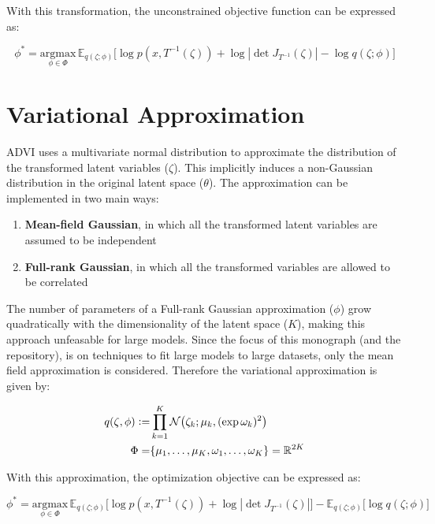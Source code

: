 \documentclass[10pt]{article}
\newcommand{\defeq}{\vcentcolon=}
\begin{document}
With this transformation, the unconstrained objective function can be expressed as:

\begin{equation*}
  \phi^* = \underset{\phi \in \Phi}{\text{argmax}} \, \mathbb{E}_{q(\zeta; \phi)}\big[\log p(x, T^{-1}(\zeta)) + \log |\det J_{T^{-1}}(\zeta)| - \log q(\zeta; \phi) \big]
\end{equation*}

\section*{Variational Approximation}

ADVI uses a multivariate normal distribution to approximate the distribution of the transformed latent variables ($\zeta$). This
implicitly induces a non-Gaussian distribution in the original latent space ($\theta$). The approximation can be implemented in
two main ways:

\begin{enumerate}
  \item \textbf{Mean-field Gaussian}, in which all the transformed latent variables are assumed to be independent
  \item \textbf{Full-rank Gaussian}, in which all the transformed variables are allowed to be correlated
\end{enumerate}

The number of parameters of a Full-rank Gaussian approximation ($\phi$) grow quadratically with the dimensionality of the 
latent space ($K$), making this approach unfeasable for large models. Since the focus of this monograph (and the repository),
is on techniques to fit large models to large datasets, only the mean field approximation is considered. Therefore the
variational approximation is given by:

\begin{align*}
  q(\zeta, \phi) \defeq& \prod_{k = 1}^{K}\mathcal{N}\big(\zeta_k; \mu_k, (\exp \omega_k)^2\big) \\
  \Phi =& \{\mu_1, \ldots, \mu_K, \omega_1, \ldots, \omega_K \} = \mathbb{R}^{2K}
\end{align*}

With this approximation, the optimization objective can be expressed as:

\begin{equation*}
  \phi^* = \underset{\phi \in \Phi}{\text{argmax}} \, \mathbb{E}_{q(\zeta; \phi)}\big[\log p(x, T^{-1}(\zeta)) + \log |\det J_{T^{-1}}(\zeta)|\big] - \mathbb{E}_{q(\zeta; \phi)}\big[\log q(\zeta; \phi) \big]
\end{equation*}
\end{document}
